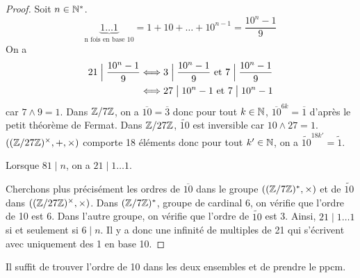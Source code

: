 \documentclass[12pt]{article}
\begin{document}
\begin{proof}
	Soit $n\in\mathbb{N}^{*}$.
	\begin{equation}
		\underbrace{1\dots 1}_{\text{n fois en base 10}}=1+10+\dots+10^{n-1}=\frac{10^{n}-1}{9}
	\end{equation}
	On a 
	\begin{align}
		21\Bigm|\frac{10^{n}-1}{9}
		&\Longleftrightarrow 3\Bigm|\frac{10^{n}-1}{9}\text{ et }7\Bigm|\frac{10^{n}-1}{9}\\
		&\Longleftrightarrow 27\bigm|10^{n}-1\text{ et }7\bigm| 10^{n}-1
	\end{align}
	car $7\wedge 9=1$.
	Dans $\mathbb{Z}/7\mathbb{Z}$, on a $\overline{10}=\overline{3}$ donc pour tout $k\in\mathbb{N}$, $\overline{10}^{6k}=\overline{1}$ d'après le petit théorème de Fermat. Dans $\mathbb{Z}/27\mathbb{Z}$, $\widetilde{10}$ est inversible car $10\wedge 27=1$. $\left((\mathbb{Z}/27\mathbb{Z})^{\times},+,\times\right)$ comporte 18 éléments donc pour tout $k'\in\mathbb{N}$, on a $\widetilde{10}^{18k'}=\widetilde{1}$.

	Lorsque $81\mid n$, on a $21\mid 1\dots 1$. 
	
	Cherchons plus précisément les ordres de $\overline{10}$ dans le groupe $((\mathbb{Z}/7\mathbb{Z})^{*},\times)$ et de $\widetilde{10}$ dans $((\mathbb{Z}/27\mathbb{Z})^{\times},\times)$.
	Dans $(\mathbb{Z}/7\mathbb{Z})^{*}$, groupe de cardinal 6, on vérifie que l'ordre de 10 est 6. Dans l'autre groupe, on vérifie que l'ordre de $\widetilde{10}$ est 3. Ainsi, $21\mid 1\dots 1$ si et seulement si $6\mid n$. Il y a donc une infinité de multiples de 21 qui s'écrivent avec uniquement des 1 en base 10.
\end{proof}

\begin{remark}
	Il suffit de trouver l'ordre de 10 dans les deux ensembles et de prendre le ppcm.
\end{remark}
\end{document}
